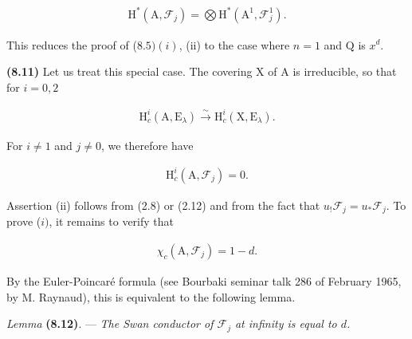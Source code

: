 \documentclass[10pt,leqno]{article}
\begin{document}
\begin{equation*}\begin{gathered}\mathrm{H}^{*}(\mathrm{A},\mathcal{F} _{j}) = \bigotimes \mathrm{H}^{*}(\mathrm{A}^{1},\mathcal{F} _{j}^{1}).\end{gathered}\end{equation*}

\noindent This reduces the proof of (\(8.5) (i)\), (ii) to the case where \(n = 1\) and \(\mathrm{Q}\) is \(x^{d}\).\par

\noindent \textbf{(8.11)} Let us treat this special case. The covering \(\mathrm{X}\) of \(\mathrm{A}\) is irreducible, so that for \(i = 0,2\)\par

\begin{equation*}\begin{gathered}\mathrm{H}_{c}^{i}(\mathrm{A},\mathrm{E}_{\lambda }) \xrightarrow{\sim } \mathrm{H}_{c}^{i}(\mathrm{X},\mathrm{E}_{\lambda }).\end{gathered}\end{equation*}

\noindent For \(i \ne  1\) and \(j \ne  0\), we therefore have\par

\begin{equation*}\begin{gathered}\mathrm{H}_{c}^{i}(\mathrm{A},\mathcal{F} _{j}) = 0.\end{gathered}\end{equation*}

\noindent Assertion (ii) follows from (2.8) or (2.12) and from the fact that \(u_{!}\mathcal{F} _{j} = u_{*}\mathcal{F} _{j}\). To prove (\(i)\), it remains to verify that\par

\begin{equation*}\begin{gathered}\chi _{c}(\mathrm{A},\mathcal{F} _{j}) = 1-d.\end{gathered}\end{equation*}

\noindent By the Euler-Poincaré formula (see Bourbaki seminar talk 286 of February 1965, by \(\mathrm{M}\). Raynaud), this is equivalent to the following lemma.\par

\noindent \emph{Lemma} \textbf{(8.12)}. — {\itshape The Swan conductor of \(\mathcal{F} _{j}\) at infinity is equal to \(d\).}\par
\end{document}
